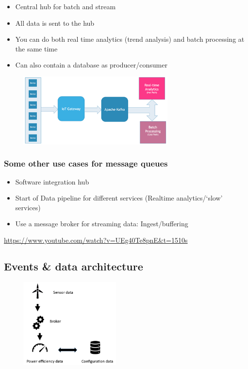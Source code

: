 \documentclass{article}
\begin{document}
\begin{itemize}
    \item Central hub for batch and stream
    \item All data is sent to the hub
    \item You can do both real time analytics (trend analysis) and batch processing at the same time
    \item Can also contain a database as producer/consumer
\end{itemize}

\begin{figure}[H]
    \centering
    \includegraphics[width=0.7\textwidth]{message-queue-analytics.png}
\end{figure}

\subsubsection{Some other use cases for message queues}

\begin{itemize}
    \item Software integration hub
    \item Start of Data pipeline for different services (Realtime analytics/`slow' services)
    \item Use a message broker for streaming data: Ingest/buffering
\end{itemize}

\url{https://www.youtube.com/watch?v=UEg40Te8pnE&t=1510s}

\subsection{Events \& data architecture}

\begin{figure}[H]
    \centering
    \includegraphics[width=0.45\textwidth]{events-data-architecture-1.png}
\end{figure}
\end{document}
